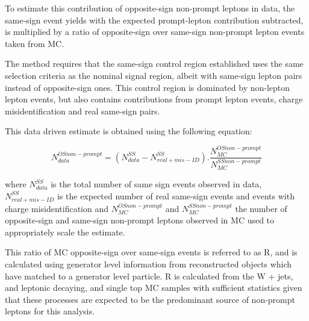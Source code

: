 To estimate this contribution of opposite-sign non-prompt leptons in data, the same-sign event yields with the expected prompt-lepton contribution subtracted, is multiplied by a ratio of opposite-sign over same-sign non-prompt lepton events taken from MC.

The method requires that the same-sign control region established uses the same selection criteria as the nominal signal region, albeit with same-sign lepton pairs instead of opposite-sign ones.
This control region is dominated by non-lepton lepton events, but also contains contributions from prompt lepton events, charge misidentification and real same-sign pairs.

This data driven estimate is obtained using the following equation:

\begin{equation}
 N_{data}^{OS non-prompt} = (N_{data}^{SS} - N^{SS}_{real + mis-ID}).\frac{N_{MC}^{OS non-prompt}}{N_{MC}^{SS non-prompt}}
\end{equation}

where $N_{data}^{SS}$ is the total number of same sign events observed in data, $N^{SS}_{real + mis-ID}$ is the expected number of real same-sign events and events with charge misidentification and $N_{MC}^{OS non-prompt}$ and $N_{MC}^{SS non-prompt}$ the number of opposite-sign and same-sign non-prompt leptons observed in MC used to appropriately scale the estimate.

This ratio of MC opposite-sign over same-sign events is referred to as R, and is calculated using generator level information from reconstructed objects which have matched to a generator level particle. R is calculated from the W + jets, \ttZ and \ttW leptonic decaying, and single top MC samples with sufficient statistics given that these processes are expected to be the predominant source of non-prompt leptons for this analysis. 

